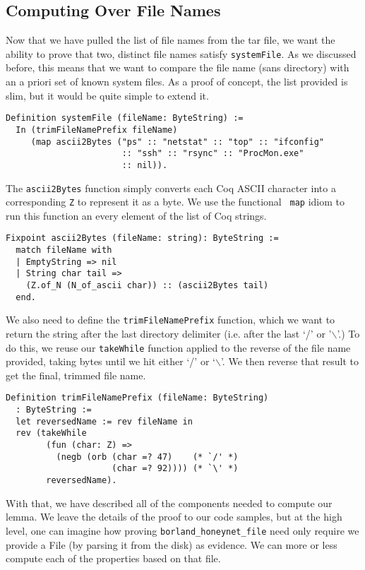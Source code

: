\documentclass[nocopyrightspace]{sigplanconf}
\begin{document}
\subsection{Computing Over File Names}
Now that we have pulled the list of file names from the tar file, we want the
ability to prove that two, distinct file names satisfy {\tt systemFile}. As we
discussed before, this means that we want to compare the file name (sans
directory) with an a priori set of known system files. As a proof of concept,
the list provided is slim, but it would be quite simple to extend it.

\begin{lstlisting}
Definition systemFile (fileName: ByteString) :=
  In (trimFileNamePrefix fileName)
     (map ascii2Bytes ("ps" :: "netstat" :: "top" :: "ifconfig" 
                       :: "ssh" :: "rsync" :: "ProcMon.exe"
                       :: nil)).
\end{lstlisting}

The {\tt ascii2Bytes} function simply converts each Coq ASCII character into a
corresponding {\tt Z} to represent it as a byte. We use the functional {\tt
map} idiom to run this function an every element of the list of Coq strings.

\begin{lstlisting}
Fixpoint ascii2Bytes (fileName: string): ByteString :=
  match fileName with
  | EmptyString => nil
  | String char tail => 
    (Z.of_N (N_of_ascii char)) :: (ascii2Bytes tail)
  end.
\end{lstlisting}

We also need to define the {\tt trimFileNamePrefix} function, which we want to
return the string after the last directory delimiter (i.e. after the last `/'
or '$\backslash$'.) To do this, we reuse our {\tt takeWhile} function applied
to the reverse of the file name provided, taking bytes until we hit either `/'
or `$\backslash$'. We then reverse that result to get the final, trimmed file
name.

\begin{lstlisting}
Definition trimFileNamePrefix (fileName: ByteString)
  : ByteString :=
  let reversedName := rev fileName in
  rev (takeWhile 
        (fun (char: Z) => 
          (negb (orb (char =? 47)    (* `/' *)
                     (char =? 92)))) (* `\' *)
        reversedName).
\end{lstlisting}

With that, we have described all of the components needed to compute our
lemma. We leave the details of the proof to our code samples, but at the high
level, one can imagine how proving {\tt borland\_honeynet\_file} need only
require we provide a File (by parsing it from the disk) as evidence. We can
more or less compute each of the properties based on that file.
\end{document}
